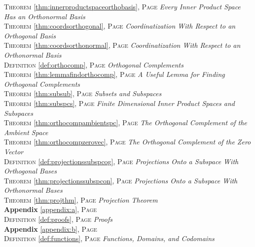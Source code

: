\begin{multicols}{2}
{\textsc{Theorem} \ref{thm:innerproductspaceorthobasis}, \textsc{Page} \pageref{thm:innerproductspaceorthobasis} \textit{Every Inner Product Space Has an Orthonormal Basis} \\
\textsc{Theorem} \ref{thm:coordsorthogonal}, \textsc{Page} \pageref{thm:coordsorthogonal} \textit{Coordinatization With Respect to an Orthogonal Basis} \\
\textsc{Theorem} \ref{thm:coordsorthonormal}, \textsc{Page} \pageref{thm:coordsorthonormal} \textit{Coordinatization With Respect to an Orthonormal Basis} \\
\textsc{Definition} \ref{def:orthocomp}, \textsc{Page} \pageref{def:orthocomp} \textit{Orthogonal Complements} \\
\textsc{Theorem} \ref{thm:lemmafindorthocomp}, \textsc{Page} \pageref{thm:lemmafindorthocomp} \textit{A Useful Lemma for Finding Orthogonal Complements} \\
\textsc{Theorem} \ref{thm:subsub}, \textsc{Page} \pageref{thm:subsub} \textit{Subsets and Subspaces} \\
\textsc{Theorem} \ref{thm:subspcs}, \textsc{Page} \pageref{thm:subspcs} \textit{Finite Dimensional Inner Product Spaces and Subspaces} \\
\textsc{Theorem} \ref{thm:orthocompambientspc}, \textsc{Page} \pageref{thm:orthocompambientspc} \textit{The Orthogonal Complement of the Ambient Space} \\
\textsc{Theorem} \ref{thm:orthocompzerovec}, \textsc{Page} \pageref{thm:orthocompzerovec} \textit{The Orthogonal Complement of the Zero Vector} \\
\textsc{Definition} \ref{def:projectionssubspcog}, \textsc{Page} \pageref{def:projectionssubspcog} \textit{Projections Onto a Subspace With Orthogonal Bases} \\
\textsc{Theorem} \ref{thm:projectionssubspcon}, \textsc{Page} \pageref{thm:projectionssubspcon} \textit{Projections Onto a Subspace With Orthonormal Bases} \\
\textsc{Theorem} \ref{thm:projthm}, \textsc{Page} \pageref{thm:projthm} \textit{Projection Theorem} \\
\textbf{Appendix} \ref{appendix:a}, \textsc{Page} \pageref{appendix:a} \\
\textsc{Definition} \ref{def:proofs}, \textsc{Page} \pageref{def:proofs} \textit{Proofs} \\
\textbf{Appendix} \ref{appendix:b}, \textsc{Page} \pageref{appendix:b} \\
\textsc{Definition} \ref{def:functions}, \textsc{Page} \pageref{def:functions} \textit{Functions, Domains, and Codomains} \\
}
\end{multicols}

